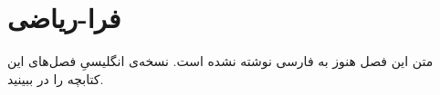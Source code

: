 \chapter{فرا-ریاضی}
\label{ch:14-metamathematics-fa-01}

متن این فصل هنوز به فارسی نوشته نشده است. نسخه‌ی انگلیسیِ فصل‌های این کتابچه را در  ببینید.
